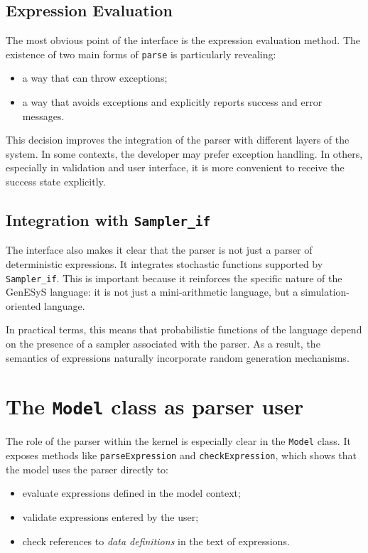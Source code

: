 \subsection{Expression Evaluation}
\label{subsec:cap9_avaliacao_expressoes}

The most obvious point of the interface is the expression evaluation method. The existence of two main forms of \texttt{parse} is particularly revealing:
\begin{itemize}
 \item a way that can throw exceptions;
 \item a way that avoids exceptions and explicitly reports success and error messages.
\end{itemize}

This decision improves the integration of the parser with different layers of the system. In some contexts, the developer may prefer exception handling. In others, especially in validation and user interface, it is more convenient to receive the success state explicitly.

\subsection{Integration with \texttt{Sampler\_if}}
\label{subsec:cap9_integracao_sampler_if}

The interface also makes it clear that the parser is not just a parser of deterministic expressions. It integrates stochastic functions supported by \texttt{Sampler\_if}. This is important because it reinforces the specific nature of the GenESyS language: it is not just a mini-arithmetic language, but a simulation-oriented language.

In practical terms, this means that probabilistic functions of the language depend on the presence of a sampler associated with the parser. As a result, the semantics of expressions naturally incorporate random generation mechanisms.

\section{The \texttt{Model} class as parser user}
\label{sec:cap9_model_como_usuario_parser}

The role of the parser within the kernel is especially clear in the \texttt{Model} class. It exposes methods like \texttt{parseExpression} and \texttt{checkExpression}, which shows that the model uses the parser directly to:
\begin{itemize}
 \item evaluate expressions defined in the model context;
 \item validate expressions entered by the user;
 \item check references to \textit{data definitions} in the text of expressions.
\end{itemize}

